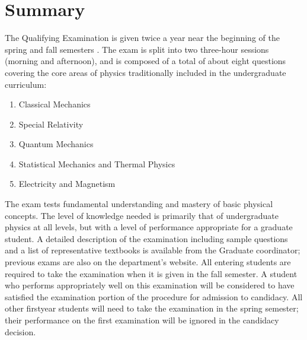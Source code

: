 \section{Summary}
The Qualifying Examination is given twice a year near the
beginning of the spring and fall semesters \cite{whiteheadGraduateHandbookPenn2014}. 
The exam is split into two three-hour sessions (morning and afternoon), and is composed of a total of about eight questions covering the core areas of physics traditionally included in the undergraduate curriculum:

\begin{enumerate}
	\item Classical Mechanics
	\item Special Relativity
	\item Quantum Mechanics
	\item Statistical Mechanics and Thermal Physics
	\item Electricity and Magnetism
\end{enumerate}

The exam tests fundamental understanding and mastery of basic physical concepts.
The level of knowledge needed is primarily that of undergraduate physics at all levels, but with a level of performance appropriate for a graduate student. 
A detailed description of the examination including sample questions and a list of representative textbooks is available from the Graduate coordinator; previous exams are also on the department’s website. All entering students are required to take the examination when it is given in the fall semester. A student who performs appropriately well on this examination will be considered to have satisfied the examination portion of the procedure for admission to candidacy. All other firstyear students will need to take the examination in the spring semester; their performance on the first examination will be ignored in the candidacy decision.
 
